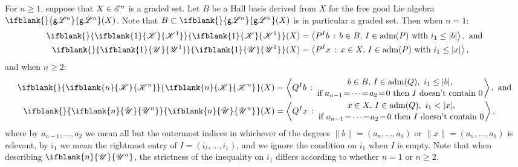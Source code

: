 \documentclass[10pt]{article}
\newcommand{\GS}[1]{\scrE^{#1}}
\newcommand{\GoodLie}[1]{\mathsf{g}{\scrL}^{#1}}%
\newcommand{\LL}[1]{\ifblank{#1}{\scrK}{\scrK^{#1}}}
\newcommand{\nontop}[1]{\ifblank{#1}{\scrU}{\scrU^{#1}}}
\newcommand{\admis}[1]{\mathrm{adm}(#1)}%
\newcommand{\Fr}[2][]{\ifblank{#1}{#2}{#2_{#1}}}
\renewcommand{\Q}{Q}
\begin{document}
\begin{CategoriesOfInterest}
\begin{prop}\label{PropFreeKandUconstructions}
For $n\geq1$, suppose that $X\in\GS{n}$ is a graded set. Let $B$ be a Hall basis derived from $X$ for the free good Lie algebra $\Fr{\GoodLie{n}}(X)$. Note that $B\subset \Fr{\GoodLie{n}}(X)$ is in particular a graded set. Then when $n=1$:
\begin{alignat*}{2}
{\Fr{\LL{1}}(X)}
&=
\left\langle P^Ib\,:\,b\in B,\,I\in\admis{P}\textup{ with }i_1\leq|b|  \right\rangle,\textup{ and}%
\\
{\Fr{\nontop{1}}(X)}
&=
\left\langle P^Ix\,:\,x\in X,\,I\in\admis{P}\textup{ with }i_1\leq|x|\right\rangle,%
\end{alignat*}
and when $n\geq2$:
\begin{alignat*}{2}
{\Fr{\LL{n}}(X)}
&=
\left\langle \Q^Ib\,:\,\genfrac{}{}{0pt}{}{b\in B,\,I\in\admis{\Q},\ i_1\leq|b|,}{\textup{if }a_{n-1}\!=\!\cdots\!=\!a_2\!=\!0\textup{ then $I$ doesn't contain 0}}\right\rangle,\textup{ and}%
\\
{\Fr{\nontop{n}}(X)}
&=
\left\langle \Q^Ix\,:\,\genfrac{}{}{0pt}{}{x\in X,\,I\in\admis{\Q},\ i_1<|x|,}{\textup{if }a_{n-1}\!=\!\cdots\!=\!a_2\!=\!0\textup{ then $I$ doesn't contain 0}}\right\rangle,%
\end{alignat*}
where by $a_{n-1},\ldots,a_2$ we mean all but the outermost indices in whichever of the degrees $\|b\|=(a_{n},\ldots,a_1)$ or $\|x\|=(a_{n},\ldots,a_1)$ is relevant, by $i_1$ we mean the rightmost entry of $I=(i_\ell,\ldots,i_1)$, and we ignore the condition on $i_1$ when $I$ is empty. Note that when describing  $\nontop{n}$, the strictness of the inequality on $i_1$ differs according to whether $n=1$ or $n\geq2$.
\end{prop}

\end{CategoriesOfInterest}
\end{document}
